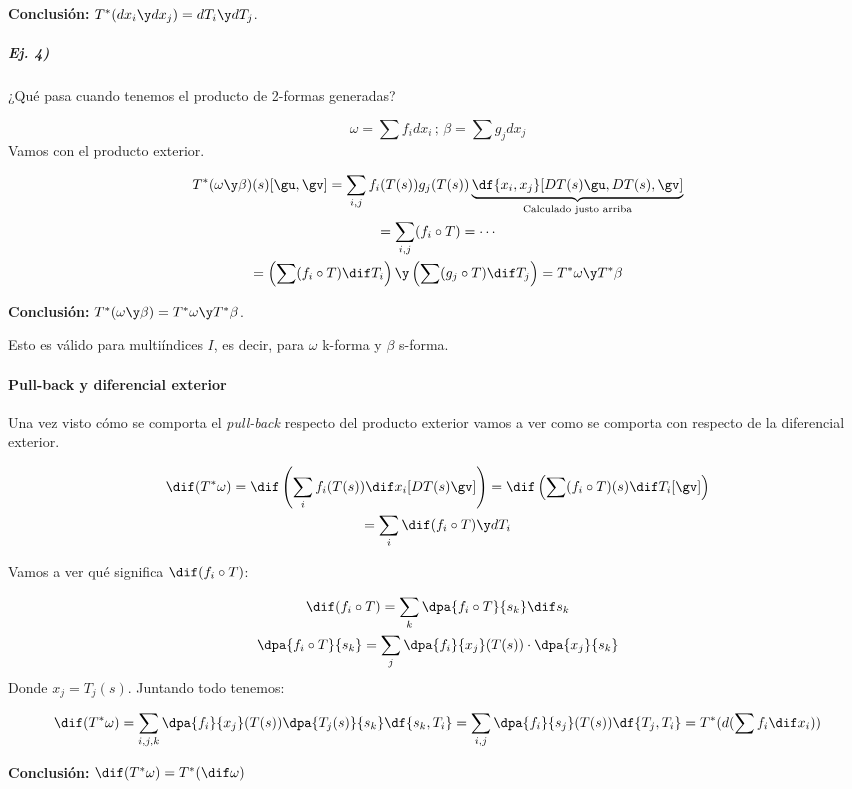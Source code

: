 \textbf{Conclusión: } $T^{\ast} (dx_i \y dx_j) = dT_i \y dT_j$.

\subparagraph{Ej. 4)} ¿Qué pasa cuando tenemos el producto de 2-formas generadas?

\[\omega = \sum f_idx_i\,;\,\beta=\sum g_jdx_j\]
Vamos con el producto exterior.

\begin{gather*}
T^{\ast} (\omega \y \beta) (s) [\gu,\gv] = \sum_{i,j} f_i(T(s))g_j(T(s)) \underbrace{\df{x_i,x_j} [DT(s)\gu, DT(s),\gv]}_{\text{Calculado justo arriba}}\\
= \sum_{i,j} (f_i\circ T) = \dotsb \\
= \left(\sum (f_i\circ T)\dif T_i\right)\y\left(\sum(g_j \circ T) \dif T_j\right) = T^{\ast}\omega \y T^{\ast}\beta
\end{gather*}

\textbf{Conclusión: } $T^{\ast}(\omega \y \beta) = T^{\ast}\omega \y T^{\ast}\beta$.

Esto es válido para multiíndices $I$, es decir, para $\omega$ k-forma y $\beta$ s-forma.


\paragraph{Pull-back y diferencial exterior}
Una vez visto cómo se comporta el \emph{pull-back} respecto del producto exterior vamos a ver como se comporta con respecto de la diferencial exterior.

\begin{gather*}
\dif (T^{\ast} \omega) = \dif \left(\sum_i f_i(T(s)) \dif x_i [DT(s)\gv]\right) = \dif\left(\sum (f_i \circ T)(s) \dif T_i[\gv]\right)\\
= \sum_i \dif(f_i\circ T)\y dT_i
\end{gather*}

Vamos a ver qué significa $\dif(f_i\circ T)$:

\begin{gather*}
\dif (f_i\circ T) =  \sum_k \dpa{f_i\circ T}{s_k} \dif s_k \\
\dpa{f_i\circ T}{s_k} = \sum_j \dpa{f_i}{x_j}(T(s))\cdot \dpa{x_j}{s_k}
\end{gather*}
Donde $x_j = T_j(s)$. Juntando todo tenemos:

\[
\dif (T^{\ast} \omega) = \sum_{i,j,k} \dpa{f_i}{x_j}(T(s)) \dpa{T_j(s)}{s_k} \df{s_k,T_i} = \sum_{i,j} \dpa{f_i}{s_j}(T(s)) \df{T_j,T_i} = T^{\ast}(d(\sum f_i \dif x_i))
\]

 \textbf{Conclusión: } $\dif (T^{\ast}\omega) = T^{\ast}(\dif \omega)$



